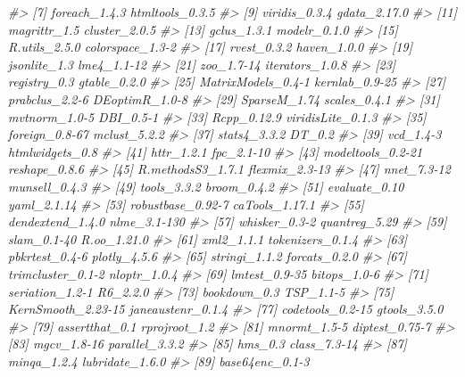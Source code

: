\documentclass[12pt,]{book}
\makeatletter
\newenvironment{Shaded}{\begin{snugshade}}{\end{snugshade}}
\newcommand{\CommentTok}[1]{\textcolor[rgb]{0.56,0.35,0.01}{\textit{{#1}}}}
\newenvironment{kframe}{%
\medskip{}
\setlength{\fboxsep}{.8em}
 \def\at@end@of@kframe{}%
 \ifinner\ifhmode%
  \def\at@end@of@kframe{\end{minipage}}%
  \begin{minipage}{\columnwidth}%
 \fi\fi%
 \def\FrameCommand##1{\hskip\@totalleftmargin \hskip-\fboxsep
 \colorbox{shadecolor}{##1}\hskip-\fboxsep
     \hskip-\linewidth \hskip-\@totalleftmargin \hskip\columnwidth}%
 \MakeFramed {\advance\hsize-\width
   \@totalleftmargin\z@ \linewidth\hsize
   \@setminipage}}%
 {\par\unskip\endMakeFramed%
 \at@end@of@kframe}
\renewenvironment{Shaded}{\begin{kframe}}{\end{kframe}}
\makeatother
\begin{document}
\begin{Shaded}
\begin{Highlighting}[]
\CommentTok{#>  [7] foreach_1.4.3       htmltools_0.3.5    }
\CommentTok{#>  [9] viridis_0.3.4       gdata_2.17.0       }
\CommentTok{#> [11] magrittr_1.5        cluster_2.0.5      }
\CommentTok{#> [13] gclus_1.3.1         modelr_0.1.0       }
\CommentTok{#> [15] R.utils_2.5.0       colorspace_1.3-2   }
\CommentTok{#> [17] rvest_0.3.2         haven_1.0.0        }
\CommentTok{#> [19] jsonlite_1.3        lme4_1.1-12        }
\CommentTok{#> [21] zoo_1.7-14          iterators_1.0.8    }
\CommentTok{#> [23] registry_0.3        gtable_0.2.0       }
\CommentTok{#> [25] MatrixModels_0.4-1  kernlab_0.9-25     }
\CommentTok{#> [27] prabclus_2.2-6      DEoptimR_1.0-8     }
\CommentTok{#> [29] SparseM_1.74        scales_0.4.1       }
\CommentTok{#> [31] mvtnorm_1.0-5       DBI_0.5-1          }
\CommentTok{#> [33] Rcpp_0.12.9         viridisLite_0.1.3  }
\CommentTok{#> [35] foreign_0.8-67      mclust_5.2.2       }
\CommentTok{#> [37] stats4_3.3.2        DT_0.2             }
\CommentTok{#> [39] vcd_1.4-3           htmlwidgets_0.8    }
\CommentTok{#> [41] httr_1.2.1          fpc_2.1-10         }
\CommentTok{#> [43] modeltools_0.2-21   reshape_0.8.6      }
\CommentTok{#> [45] R.methodsS3_1.7.1   flexmix_2.3-13     }
\CommentTok{#> [47] nnet_7.3-12         munsell_0.4.3      }
\CommentTok{#> [49] tools_3.3.2         broom_0.4.2        }
\CommentTok{#> [51] evaluate_0.10       yaml_2.1.14        }
\CommentTok{#> [53] robustbase_0.92-7   caTools_1.17.1     }
\CommentTok{#> [55] dendextend_1.4.0    nlme_3.1-130       }
\CommentTok{#> [57] whisker_0.3-2       quantreg_5.29      }
\CommentTok{#> [59] slam_0.1-40         R.oo_1.21.0        }
\CommentTok{#> [61] xml2_1.1.1          tokenizers_0.1.4   }
\CommentTok{#> [63] pbkrtest_0.4-6      plotly_4.5.6       }
\CommentTok{#> [65] stringi_1.1.2       forcats_0.2.0      }
\CommentTok{#> [67] trimcluster_0.1-2   nloptr_1.0.4       }
\CommentTok{#> [69] lmtest_0.9-35       bitops_1.0-6       }
\CommentTok{#> [71] seriation_1.2-1     R6_2.2.0           }
\CommentTok{#> [73] bookdown_0.3        TSP_1.1-5          }
\CommentTok{#> [75] KernSmooth_2.23-15  janeaustenr_0.1.4  }
\CommentTok{#> [77] codetools_0.2-15    gtools_3.5.0       }
\CommentTok{#> [79] assertthat_0.1      rprojroot_1.2      }
\CommentTok{#> [81] mnormt_1.5-5        diptest_0.75-7     }
\CommentTok{#> [83] mgcv_1.8-16         parallel_3.3.2     }
\CommentTok{#> [85] hms_0.3             class_7.3-14       }
\CommentTok{#> [87] minqa_1.2.4         lubridate_1.6.0    }
\CommentTok{#> [89] base64enc_0.1-3}
\end{Highlighting}
\end{Shaded}
\end{document}

